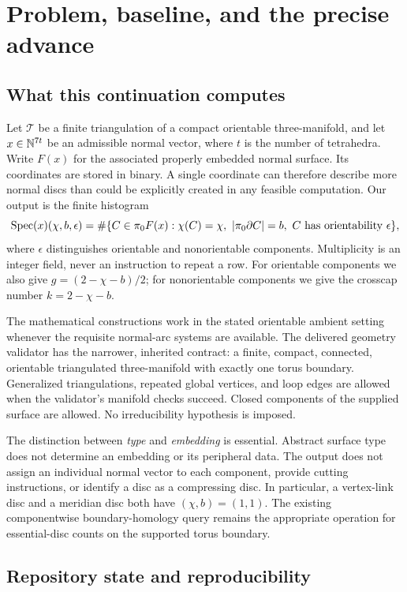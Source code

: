 \section{Problem, baseline, and the precise advance}
\label{sec:overview}

\subsection{What this continuation computes}

Let $\mathcal T$ be a finite triangulation of a compact orientable
three-manifold, and let $x\in\mathbb N^{7t}$ be an admissible normal vector, where
$t$ is the number of tetrahedra. Write $F(x)$ for the associated properly
embedded normal surface. Its coordinates are stored in binary. A single
coordinate can therefore describe more normal discs than could be explicitly
created in any feasible computation. Our output is the finite histogram
\[
 \operatorname{Spec}(x)(\chi,b,\epsilon)
 =\#\{C\in\pi_0F(x):\chi(C)=\chi,\ |\pi_0\partial C|=b,
                         \ C\text{ has orientability }\epsilon\},
\]
where $\epsilon$ distinguishes orientable and nonorientable components.
Multiplicity is an integer field, never an instruction to repeat a row.
For orientable components we also give $g=(2-\chi-b)/2$; for
nonorientable components we give the crosscap number $k=2-\chi-b$.

The mathematical constructions work in the stated orientable ambient setting
whenever the requisite normal-arc systems are available. The delivered geometry
validator has the narrower, inherited contract: a finite, compact, connected,
orientable triangulated three-manifold with exactly one torus boundary.
Generalized triangulations, repeated global vertices, and loop edges are allowed
when the validator's manifold checks succeed. Closed components of the supplied
surface are allowed. No irreducibility hypothesis is imposed.

The distinction between \emph{type} and \emph{embedding} is essential.
Abstract surface type does not determine an embedding or its peripheral data.
The output does not assign an individual normal vector to each component,
provide cutting instructions, or identify a disc as a compressing disc. In
particular, a vertex-link disc and a meridian disc both have $(\chi,b)=(1,1)$.
The existing componentwise boundary-homology query remains the appropriate
operation for essential-disc counts on the supported torus boundary.

\subsection{Repository state and reproducibility}


